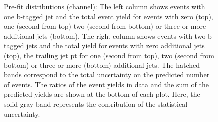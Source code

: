 \begin{figure}[htbp!]
\begin{center}
\caption{Pre-fit distributions (\mumu channel): 
  The left column shows events with one b-tagged jet and the total event yield for events with zero (top), one (second from top)
  two (second from bottom) or three or more additional jets (bottom).
  The right column shows events with two b-tagged jets and the total yield for events with zero additional jets (top),
  the trailing jet pt for one (second from top),
  two (second from bottom) or three or more (bottom) additional jets.
  The hatched bands correspond to the total uncertainty on the predicted number of events. The ratios of the event yields in data and the sum of the
  predicted yields are shown at the bottom of each plot. Here, the solid
  gray band represents the contribution of the statistical uncertainty.  
       \label{fig:xsec_mumu_inputdistr}}
  \end{center}
\end{figure}

